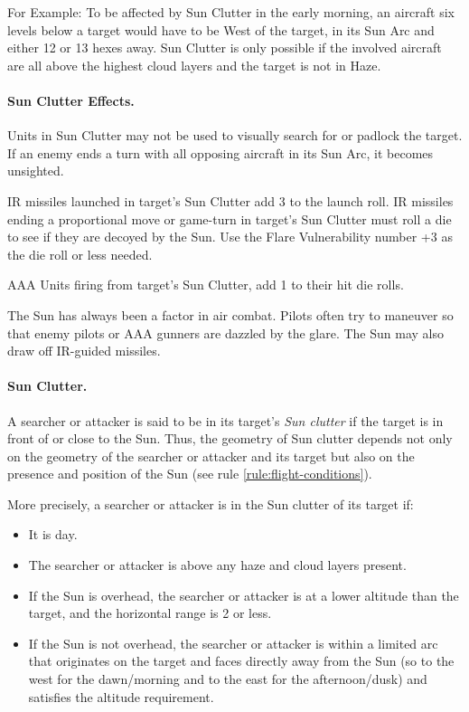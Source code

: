 \begin{advancedrules}
{{
}

For Example: To be affected by Sun Clutter in the early morning, an aircraft six levels below a target would have to be West of the target, in its Sun Arc and either 12 or 13 hexes away. Sun Clutter is only possible if the involved aircraft are all above the highest cloud layers and the target is not in Haze.

\paragraph{Sun Clutter Effects.} Units in Sun Clutter may not be used to visually search for or padlock the target. If an enemy ends a turn with all opposing aircraft in its Sun Arc, it becomes unsighted.

IR missiles launched in target's Sun Clutter add 3 to the launch roll. IR missiles ending a proportional move or game-turn in target's Sun Clutter must roll a die to see if they are decoyed by the Sun. Use the Flare Vulnerability number +3 as the die roll or less needed.

AAA Units firing from target's Sun Clutter, add 1 to their hit die rolls.

}{

The Sun has always been a factor in air combat. Pilots often try to maneuver so that enemy pilots or AAA gunners are dazzled by the glare. The Sun may also draw off IR-guided missiles.

\paragraph{Sun Clutter.} 
A searcher or attacker is said to be in its target's \emph{Sun clutter} if the target is in front of or close to the Sun. Thus, the geometry of Sun clutter depends not only on the geometry of the searcher or attacker and its target but also on the presence and position of the Sun (see rule \ref{rule:flight-conditions}).

More precisely, a searcher or attacker is in the Sun clutter of its target if:

\begin{itemize}
\item It is day.
\item The searcher or attacker is above any haze and cloud layers present.
\item If the Sun is overhead, the searcher or attacker is at a lower altitude than the target, and the horizontal range is 2 or less.
\item If the Sun is not overhead, the searcher or attacker is within a limited arc that originates on the target and faces directly away from the Sun (so to the west for the dawn/morning and to the east for the afternoon/dusk) and satisfies the altitude requirement. 


\end{itemize}}
\end{advancedrules}
